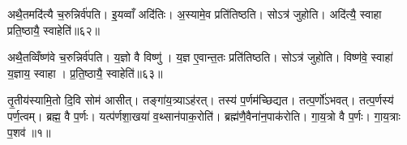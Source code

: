 अथै॒तमदि॑त्यै च॒रुन्निर्व॑पति। इ॒यव्वाँ अदि॑तिः। अ॒स्यामे॒व प्रति॑तिष्ठति। सोऽत्र॑ जुहोति। अदि॑त्यै॒ स्वाहा प्रति॒ष्ठायै॒ स्वाहेति॑॥६२॥

अथै॒तव्विँष्ण॑वे च॒रुन्निर्व॑पति। य॒ज्ञो वै विष्णु॑। य॒ज्ञ ए॒वान्त॒तः प्रति॑तिष्ठति। सोऽत्र॑ जुहोति। विष्ण॑वे॒ स्वाहा॑ य॒ज्ञाय॒ स्वाहा। प्र॒ति॒ष्ठायै॒ स्वाहेति॑॥६३॥



\clearpage
{}
\setcounter{anuvakam}{0}
तृ॒तीय॑स्यामि॒तो दि॒वि सोम॑ आसीत्। तङ्गा॑य॒त्र्याऽह॑रत्। तस्य॑ प॒र्णम॑च्छिद्यत। तत्प॒र्णो॑ऽभवत्। तत्प॒र्णस्य॑ पर्ण॒त्वम्। ब्रह्म॒ वै प॒र्णः। यत्प॑र्णशा॒खया॑ व॒थ्सान॑पाक॒रोति॑। ब्रह्म॑णै॒वैना॑न॒पाक॑रोति। गा॒य॒त्रो वै प॒र्णः। गा॒य॒त्राः प॒शव॑॥१॥

